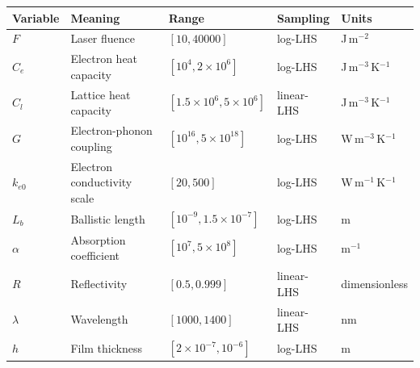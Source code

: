 \begin{tabular}{lllll}
\hline
Variable & Meaning & Range & Sampling & Units \\
\hline
$F$ & Laser fluence & $[10,40000]$ & log-LHS & J\,m$^{-2}$ \\
$C_e$ & Electron heat capacity & $[10^4,2\times10^6]$ & log-LHS & J\,m$^{-3}$\,K$^{-1}$ \\
$C_l$ & Lattice heat capacity & $[1.5\times10^6,5\times10^6]$ & linear-LHS & J\,m$^{-3}$\,K$^{-1}$ \\
$G$ & Electron-phonon coupling & $[10^{16},5\times10^{18}]$ & log-LHS & W\,m$^{-3}$\,K$^{-1}$ \\
$k_{e0}$ & Electron conductivity scale & $[20,500]$ & log-LHS & W\,m$^{-1}$\,K$^{-1}$ \\
$L_b$ & Ballistic length & $[10^{-9},1.5\times10^{-7}]$ & log-LHS & m \\
$\alpha$ & Absorption coefficient & $[10^7,5\times10^8]$ & log-LHS & m$^{-1}$ \\
$R$ & Reflectivity & $[0.5,0.999]$ & linear-LHS & dimensionless \\
$\lambda$ & Wavelength & $[1000,1400]$ & linear-LHS & nm \\
$h$ & Film thickness & $[2\times10^{-7},10^{-6}]$ & log-LHS & m \\
\hline
\end{tabular}
